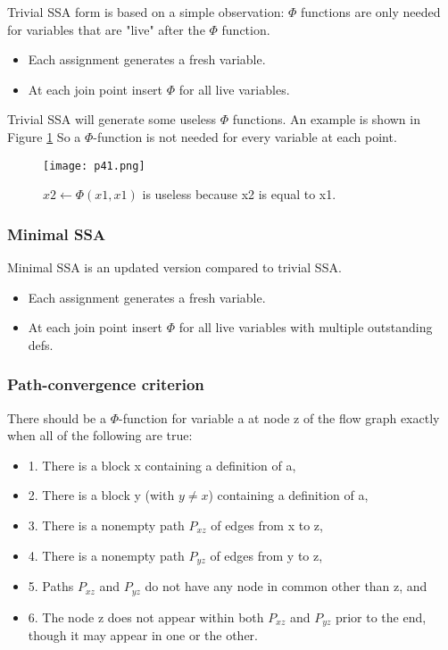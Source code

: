 Trivial SSA form is based on a simple observation: $\Phi$ functions are only needed for variables that are "live" after the $\Phi$ function.

\begin{itemize}
    \item Each assignment generates a fresh variable.
    \item At each join point insert $\Phi$ for all live variables.
\end{itemize}


Trivial SSA will generate some useless $\Phi$ functions. An example is shown in Figure \ref{fig:p41} So a $\Phi$-function is not needed for every variable at each point.

\begin{figure}[htb]
    \centering
    \texttt{[image: p41.png]}
    \caption{$x2 \leftarrow \Phi(x1,x1)$ is useless because x2 is equal to x1.}
    \label{fig:p41}

\end{figure}



\subsubsection{Minimal SSA}
Minimal SSA is an updated version compared to trivial SSA.

\begin{itemize}
    \item Each assignment generates a fresh variable.
    \item At each join point insert $\Phi$ for all live variables with multiple outstanding defs. 
\end{itemize}

\subsubsection{Path-convergence criterion}

There should be a $\Phi$-function for variable a at node z of the flow graph
exactly when all of the following are true:

\begin{itemize}
    \item 1. There is a block x containing a definition of a,
    \item 2. There is a block y (with $y \neq x$) containing a definition of a,
    \item 3. There is a nonempty path $P_{xz}$ of edges from x to z,
    \item 4. There is a nonempty path $P_{yz}$ of edges from y to z,
    \item 5. Paths $P_{xz}$ and $P_{yz}$ do not have any node in common other than z, and
    \item 6. The node z does not appear within both $P_{xz}$ and $P_{yz}$ prior to the
end, though it may appear in one or the other.
\end{itemize}



